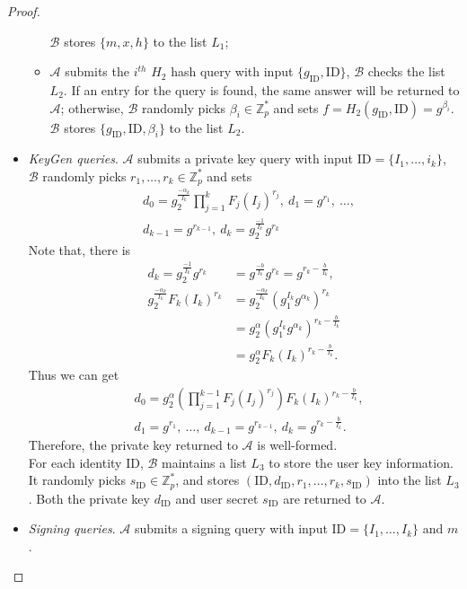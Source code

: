 \documentclass[times]{secauth}
\theoremstyle{definition}
\theoremstyle{remark}
\begin{document}
\begin{proof}
\begin{itemize}
\begin{itemize}
		$\mathcal{B}$ stores $\{m, x, h\}$ to the list $L_1$;
		\item $\mathcal{A}$ submits the $i^{th}$ $H_2$ hash query with input $\{g_\mathrm{ID}, \mathrm{ID}\}$, $\mathcal{B}$ checks the list $L_2$. 
		If an entry for the query is found, the same answer will be returned to $\mathcal{A}$; otherwise, $\mathcal{B}$ randomly picks $\beta_i \in \mathbb{Z}_p^*$ and sets $f = H_2(g_\mathrm{ID}, \mathrm{ID}) = g^{\beta_i}$. 
		$\mathcal{B}$ stores $\{g_\mathrm{ID}, \mathrm{ID}, \beta_i\}$ to the list $L_2$. 	
	\end{itemize}
	\item \emph{KeyGen queries}. 
	$\mathcal{A}$ submits a private key query with input $\mathrm{ID} = \{I_1, \ldots, i_k\}$, $\mathcal{B}$ randomly picks $r_1, \ldots, r_k \in \mathbb{Z}_p^*$ and sets
	\begin{align*}
	&d_0 = g_2^{\frac{-\alpha_k}{I_k}}\prod_{j=1}^{k}F_j(I_j)^{r_j}, ~d_1=g^{r_1}, ~\ldots, \\
	&d_{k-1}=g^{r_{k-1}}, ~d_k=g_2^{\frac{-1}{I_k}}g^{r_k}
	\end{align*}
	Note that, there is 
	\begin{align*}
	d_k = g_2^{\frac{-1}{I_k}}g^{r_k} &= g^{\frac{-b}{I_k}}g^{r_k} = g^{r_k-\frac{b}{I_k}},\\
	g_2^{\frac{-\alpha_k}{I_k}}F_k(I_k)^{r_k} &= g_2^{\frac{-\alpha_k}{I_k}}(g_1^{I_k}g^{\alpha_k})^{r_k} \\
	&= g_2^\alpha(g_1^{I_k}g^{\alpha_k})^{r_k-\frac{b}{I_k}} \\
	&= g_2^\alpha F_k(I_k)^{r_k-\frac{b}{I_k}}.
	\end{align*}
	Thus we can get 
	\begin{align*}
	&d_0 = g_2^\alpha \left(\prod_{j=1}^{k-1}F_j(I_j)^{r_j}\right)F_k(I_k)^{r_k-\frac{b}{I_k}}, \\
	&d_1=g^{r_1}, ~\ldots, ~d_{k-1}=g^{r_{k-1}}, ~d_k=g^{r_k-\frac{b}{I_k}}.
	\end{align*}
	Therefore, the private key returned to $\mathcal{A}$ is well-formed.\\
	For each identity ID, $\mathcal{B}$ maintains a list $L_3$ to store the user key information.
	It randomly picks $s_\mathrm{ID} \in \mathbb{Z}_p^*$, and stores $(\mathrm{ID}, d_\mathrm{ID}, r_1, \ldots, r_k, s_\mathrm{ID})$ into the list $L_3$. 
	Both the private key $d_{\mathrm{ID}}$ and user secret $s_\mathrm{ID}$ are returned to $\mathcal{A}$.
	\item \emph{Signing queries}. 
	$\mathcal{A}$ submits a signing query with input $\mathrm{ID} = \{I_1, \ldots, I_k\}$ and $m$.

\end{itemize}
\end{proof}
\end{document}
